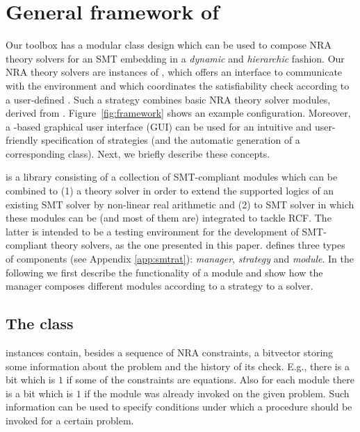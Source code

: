 \chapter{General framework of \smtrat}
\label{chapter:generalframework}


Our toolbox has a modular \Cpp class design which can be used to
compose NRA theory solvers for an SMT embedding in a \emph{dynamic}
and \emph{hierarchic} fashion. Our NRA theory solvers are instances of
\managerClass, which offers an interface to communicate with the
environment and which coordinates the satisfiability check according
to a user-defined \strategyClass. Such a strategy combines basic NRA
theory solver modules, derived from \moduleClass. 
Figure~\ref{fig:framework} shows an example configuration. Moreover, a
\Java-based graphical user interface (GUI) can be used for an
intuitive and user-friendly specification of strategies (and the
automatic generation of a corresponding \strategyClass class). Next,
we briefly describe these concepts. 

\smtrat is a \Cpp library consisting of a collection of
SMT-compliant modules which can be combined to (1) a 
theory solver in order to extend the supported logics of an
existing SMT solver by non-linear real arithmetic and (2) to
SMT solver in which these modules can be (and most of them are) 
integrated to tackle RCF. The
latter is intended to be a testing environment for the development of
SMT-compliant theory solvers, as the one presented in this paper.
\smtrat defines three types of components (see Appendix 
\ref{app:smtrat}): \emph{manager}, \emph{strategy} and \emph{module}. 
In the following we first describe the functionality of a module and
show how the manager composes different modules according to a
strategy to a solver.

\section{The \formulaClass class} \formulaClass instances contain,
besides a sequence of NRA constraints, a bitvector storing some
information about the problem and the history of its check. E.g.,
there is a bit which is $1$ if some of the constraints are equations.
Also for each module there is a bit which is $1$ if the module was
already invoked on the given problem. Such information can be used to
specify conditions under which a procedure should be invoked for a
certain problem.\smallskip


